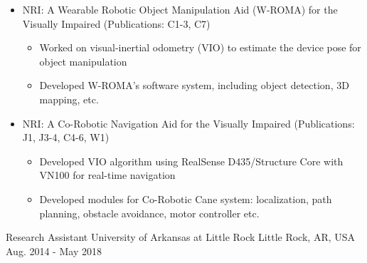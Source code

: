 \begin{cventries}
{%
      	  \vspace{-4.0mm}
      	\begin{justify}
      		\begin{itemize}[leftmargin=2ex, nosep, noitemsep]
      			\setlength{\parskip}{0pt}
      			\renewcommand{\labelitemi}{\bullet}
      			\item {NRI: A Wearable Robotic Object Manipulation Aid (W-ROMA) for the Visually Impaired (Publications: C1-3, C7)}
      			\begin{itemize}[leftmargin=3ex]
      				\scriptsize
      				\item {Worked on visual-inertial odometry (VIO) to estimate the device pose for object manipulation}
      				\item {Developed W-ROMA's software system, including object detection, 3D mapping, etc. }
      			\end{itemize}
      			\item {NRI: A Co-Robotic Navigation Aid for the Visually Impaired (Publications: J1, J3-4, C4-6, W1)}
      			\begin{itemize}[leftmargin=3ex]
      				\scriptsize
      				\item {Developed VIO algorithm using RealSense D435/Structure Core with VN100 for real-time navigation}
      				\item {Developed modules for Co-Robotic Cane system: localization, path planning, obstacle avoidance, motor controller etc.}
      			\end{itemize}
      		\end{itemize}
      	\end{justify}
      	\vspace{-4.0mm}  
     }
  \cventry
    {Research Assistant} %
    {University of Arkansas at Little Rock} %
    {Little Rock, AR, USA} %
    {Aug. 2014 - May 2018} %
    {
    	  \vspace{-4.0mm}
 \begin{justify}
 	\begin{itemize}[leftmargin=2ex, nosep, noitemsep]

\end{itemize}
\end{justify}}
\end{cventries}
